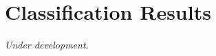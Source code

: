 \newpage
\section{Classification Results}\label{sec:classificationresults}



\textit{Under development.}